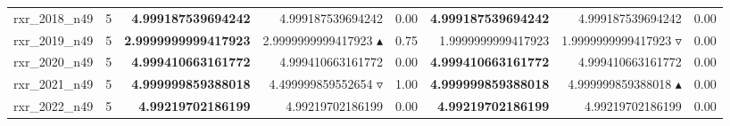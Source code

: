 \begin{table}[]
{\begin{tabular}{ll@{\hspace{1.2cm}}rrr@{\hspace{1.2cm}}rrr}
rxr_2018_n49 & 5 & \textbf{4.999187539694242} & 4.999187539694242 \phantom{$\blacktriangle$} & 0.00 & \textbf{4.999187539694242} & 4.999187539694242 \phantom{$\blacktriangle$} & 0.00 \\
rxr_2019_n49 & 5 & \textbf{2.9999999999417923} & 2.9999999999417923 $\blacktriangle$ & 0.75 & 1.9999999999417923 & 1.9999999999417923 $\triangledown$ & 0.00 \\
rxr_2020_n49 & 5 & \textbf{4.999410663161772} & 4.999410663161772 \phantom{$\blacktriangle$} & 0.00 & \textbf{4.999410663161772} & 4.999410663161772 \phantom{$\blacktriangle$} & 0.00 \\
rxr_2021_n49 & 5 & \textbf{4.999999859388018} & 4.499999859552654 $\triangledown$ & 1.00 & \textbf{4.999999859388018} & 4.999999859388018 $\blacktriangle$ & 0.00 \\
rxr_2022_n49 & 5 & \textbf{4.99219702186199} & 4.99219702186199 \phantom{$\blacktriangle$} & 0.00 & \textbf{4.99219702186199} & 4.99219702186199 \phantom{$\blacktriangle$} & 0.00 \\
\bottomrule
    \end{tabular}
    }
\end{table}
